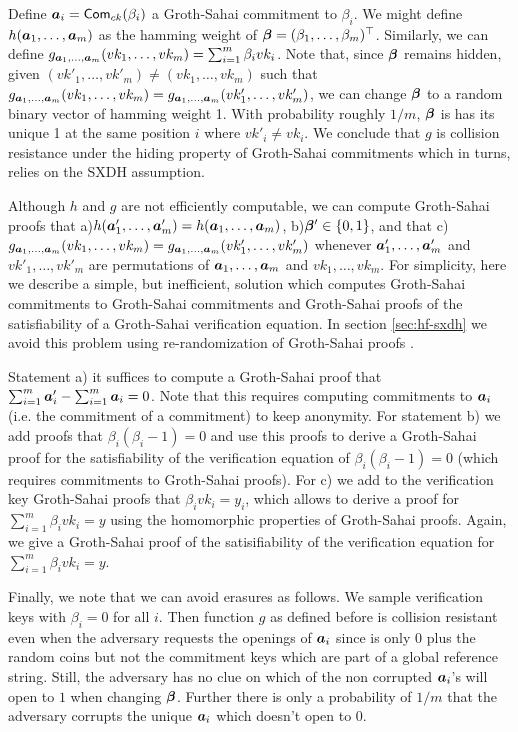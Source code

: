Define ${\boldsymbol{a}}_i = \mathsf{Com}_{ck}(\beta_i)$ a Groth-Sahai commitment to $\beta_i$. We might define $h({\boldsymbol{a}}_1,\ldots,{\boldsymbol{a}}_m)$ as the hamming weight of ${\boldsymbol{\beta}} = (\beta_1,\ldots,\beta_m)^\top$.
Similarly, we can define $g_{{\boldsymbol{a}}_1,\ldots,{\boldsymbol{a}}_m}(vk_1,\ldots,vk_m) = \sum_{i=1}^m \beta_ivk_i$. Note that, since ${\boldsymbol{\beta}}$ remains hidden, given $(vk'_1,\ldots,vk'_m)\neq (vk_1,\ldots,vk_m)$ such that $g_{{\boldsymbol{a}}_1,\ldots,{\boldsymbol{a}}_m}(vk_1,\ldots,vk_m) =g_{{\boldsymbol{a}}_1,\ldots,{\boldsymbol{a}}_m}(vk'_1,\ldots,vk'_m)$, we can change ${\boldsymbol{\beta}}$ to a random binary vector of hamming weight 1. With probability roughly $1/m$, ${\boldsymbol{\beta}}$ is has its unique 1 at the same position $i$ where $vk'_i \neq vk_i$. We conclude that $g$ is collision resistance under the hiding property of Groth-Sahai commitments which in turns, relies on the SXDH assumption.

Although $h$ and $g$ are not efficiently computable, we can compute Groth-Sahai proofs that a)$h({\boldsymbol{a}}'_1,\ldots,{\boldsymbol{a}}'_m)=h({\boldsymbol{a}}_1,\ldots,{\boldsymbol{a}}_m)$, b)${\boldsymbol{\beta}}'\in\{0,1\}$, and that c)$g_{{\boldsymbol{a}}_1,\ldots,{\boldsymbol{a}}_m}(vk_1,\ldots,vk_m) =g_{{\boldsymbol{a}}_1,\ldots,{\boldsymbol{a}}_m}(vk'_1,\ldots,vk'_m)$ whenever ${\boldsymbol{a}}'_1,\ldots,{\boldsymbol{a}}'_m$ and $vk'_1,\ldots,vk'_m$ are permutations of ${\boldsymbol{a}}_1,\ldots,{\boldsymbol{a}}_m$ and $vk_1,\ldots,vk_m$. For simplicity, here we describe a simple, but inefficient, solution which computes Groth-Sahai commitments to Groth-Sahai commitments and Groth-Sahai proofs of the satisfiability of a Groth-Sahai verification equation. In section \ref{sec:hf-sxdh} we avoid this problem using re-randomization of Groth-Sahai proofs \cite{C:BCCKLS09}.
 
Statement a) it suffices to compute a Groth-Sahai proof that $\sum_{i=1}^m {\boldsymbol{a}}'_i - \sum_{i=1}^m{\boldsymbol{a}}_i = 0$. Note that this requires computing commitments to ${\boldsymbol{a}}_i$ (i.e. the commitment of a commitment) to keep anonymity. For  statement b) we add proofs that $\beta_i(\beta_i-1)=0$ and use this proofs to derive a Groth-Sahai proof for the satisfiability of the verification equation of $\beta_i(\beta_i-1)=0$ (which requires commitments to Groth-Sahai proofs). For c) we add to the verification key Groth-Sahai proofs that $\beta_i vk_i = y_i$, which allows to derive a proof for $\sum_{i=1}^m \beta_i vk_i = y$ using the homomorphic properties of Groth-Sahai proofs. Again, we give a Groth-Sahai proof of the satisifiability of the verification equation for $\sum_{i=1}^m \beta_i vk_i = y$.

Finally, we note that we can avoid erasures as follows. We sample verification keys with $\beta_i=0$ for all $i$. Then function $g$ as defined before is collision resistant even when the adversary requests the openings of ${\boldsymbol{a}}_i$ since is only $0$ plus the random coins but not the commitment keys which are part of a global reference string. Still, the adversary has no clue on which of the non corrupted ${\boldsymbol{a}}_i$'s will open to $1$ when changing ${\boldsymbol{\beta}}$. Further there is only a probability of $1/m$ that the adversary corrupts the unique ${\boldsymbol{a}}_i$ which doesn't open to 0.


